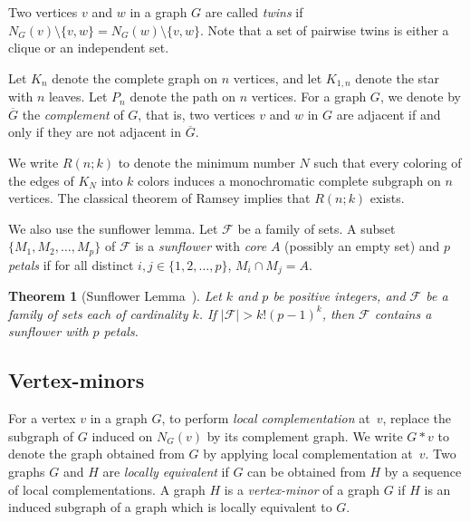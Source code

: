 \documentclass[11pt]{article}
\newtheorem{theorem}{Theorem}[section]
\newcommand\abs[1]{\lvert #1\rvert}
\newcommand{\cF}{\mathcal{F}}
\begin{document}
		Two vertices $v$ and $w$ in a graph $G$ are called \emph{twins} if 
		$N_G(v)\setminus \{v,w\}=N_G(w)\setminus \{v,w\}$.
		Note that a set of pairwise twins is either a clique or an independent set.

	Let $K_n$ denote the complete graph on $n$ vertices, and let $K_{1,n}$ denote the star with $n$ leaves.
	Let $P_n$ denote the path on $n$ vertices. 
	For a graph $G$, we denote by $\overline{G}$ the \emph{complement} of $G$, that is, two vertices $v$ and $w$ in $G$ are adjacent if and only if they are not adjacent in $\overline{G}$.
                
                
		We write $R(n;k)$ to denote the minimum number $N$ such
	that every coloring of the edges of $K_N$ into $k$ colors induces a monochromatic complete subgraph on $n$ vertices. The classical theorem of Ramsey implies that $R(n;k)$ exists.

	We also use the sunflower lemma. Let $\cF$ be a family of sets. 
	A subset $\{M_1, M_2, \ldots, M_p\}$ of $\cF$ is a \emph{sunflower} with \emph{core} $A$ (possibly an empty set) and $p$ \emph{petals} if
	for all distinct $i,j\in \{1,2, \ldots, p\}$, $M_i\cap M_j=A$. 
	
	\begin{theorem}[Sunflower Lemma~{\cite[Erd\H{o}s and Rado]{ErdosR1960}}]\label{thm:sunflower}
	Let $k$ and $p$ be positive integers, and 
	$\cF$ be a family of sets each of cardinality $k$. 
	If $\abs{\cF}> k!(p-1)^k$, then $\cF$ contains a sunflower with $p$ petals.
      \end{theorem}

      \subsection{Vertex-minors}
For a vertex $v$ in a graph $G$, to perform \emph{local complementation} at~$v$, 
replace the subgraph of $G$ induced on $N_G(v)$ 
by its complement graph. 
We write $G*v$ to denote the graph obtained from $G$ by applying
local complementation at~$v$.
Two graphs $G$ and $H$ are \emph{locally equivalent} if $G$ can be obtained from $H$ by a sequence of local complementations.
A graph $H$ is a \emph{vertex-minor} of a graph $G$
if $H$ is an induced subgraph of a graph which is locally equivalent to $G$.
\end{document}
